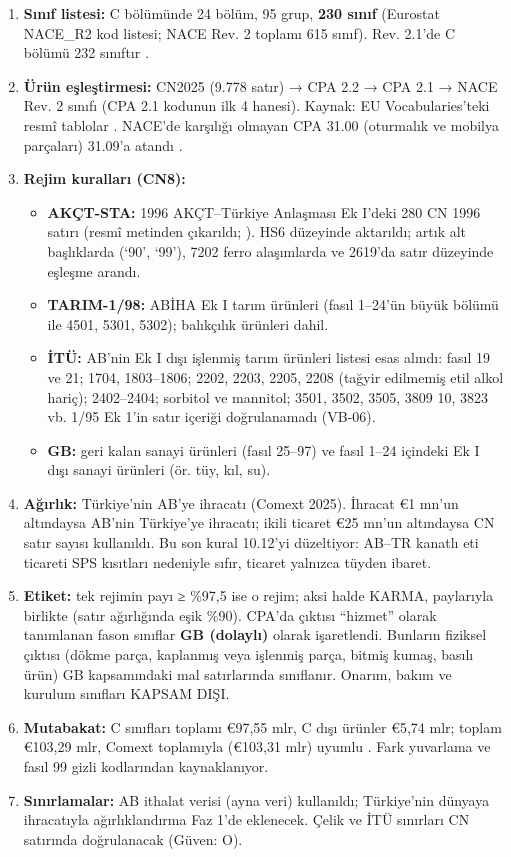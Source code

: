 \begin{enumerate}
\def\labelenumi{\arabic{enumi}.}
\tightlist
\item
  \textbf{Sınıf listesi:} C bölümünde 24 bölüm, 95 grup, \textbf{230 sınıf} \etiketV{} (Eurostat NACE\_R2 kod listesi; NACE Rev. 2 toplamı 615 sınıf). Rev. 2.1'de C bölümü 232 sınıftır \etiketV{}.
\item
  \textbf{Ürün eşleştirmesi:} CN2025 (9.778 satır) → CPA 2.2 → CPA 2.1 → NACE Rev. 2 sınıfı (CPA 2.1 kodunun ilk 4 hanesi). Kaynak: EU Vocabularies'teki resmî tablolar \etiketV{}. NACE'de karşılığı olmayan CPA 31.00 (oturmalık ve mobilya parçaları) 31.09'a atandı \etiketH{}.
\item
  \textbf{Rejim kuralları (CN8):}

  \begin{itemize}
  \tightlist
  \item
    \textbf{AKÇT-STA:} 1996 AKÇT--Türkiye Anlaşması Ek I'deki 280 CN 1996 satırı (resmî metinden çıkarıldı; ). HS6 düzeyinde aktarıldı; artık alt başlıklarda (`90', `99'), 7202 ferro alaşımlarda ve 2619'da satır düzeyinde eşleşme arandı.
  \item
    \textbf{TARIM-1/98:} ABİHA Ek I tarım ürünleri (fasıl 1--24'ün büyük bölümü ile 4501, 5301, 5302); balıkçılık ürünleri dahil.
  \item
    \textbf{İTÜ:} AB'nin Ek I dışı işlenmiş tarım ürünleri listesi esas alındı: fasıl 19 ve 21; 1704, 1803--1806; 2202, 2203, 2205, 2208 (tağyir edilmemiş etil alkol hariç); 2402--2404; sorbitol ve mannitol; 3501, 3502, 3505, 3809 10, 3823 vb. 1/95 Ek 1'in satır içeriği doğrulanamadı (VB-06).
  \item
    \textbf{GB:} geri kalan sanayi ürünleri (fasıl 25--97) ve fasıl 1--24 içindeki Ek I dışı sanayi ürünleri (ör. tüy, kıl, su).
  \end{itemize}
\item
  \textbf{Ağırlık:} Türkiye'nin AB'ye ihracatı (Comext 2025). İhracat €1 mn'un altındaysa AB'nin Türkiye'ye ihracatı; ikili ticaret €25 mn'un altındaysa CN satır sayısı kullanıldı. Bu son kural 10.12'yi düzeltiyor: AB--TR kanatlı eti ticareti SPS kısıtları nedeniyle sıfır, ticaret yalnızca tüyden ibaret.
\item
  \textbf{Etiket:} tek rejimin payı ≥ \%97,5 ise o rejim; aksi halde KARMA, paylarıyla birlikte (satır ağırlığında eşik \%90). CPA'da çıktısı ``hizmet'' olarak tanımlanan fason sınıflar \textbf{GB (dolaylı)} olarak işaretlendi. Bunların fiziksel çıktısı (dökme parça, kaplanmış veya işlenmiş parça, bitmiş kumaş, basılı ürün) GB kapsamındaki mal satırlarında sınıflanır. Onarım, bakım ve kurulum sınıfları KAPSAM DIŞI.
\item
  \textbf{Mutabakat:} C sınıfları toplamı €97,55 mlr, C dışı ürünler €5,74 mlr; toplam €103,29 mlr, Comext toplamıyla (€103,31 mlr) uyumlu \etiketV{}. Fark yuvarlama ve fasıl 99 gizli kodlarından kaynaklanıyor.
\item
  \textbf{Sınırlamalar:} AB ithalat verisi (ayna veri) kullanıldı; Türkiye'nin dünyaya ihracatıyla ağırlıklandırma Faz 1'de eklenecek. Çelik ve İTÜ sınırları CN satırında doğrulanacak (Güven: O).
\end{enumerate}

